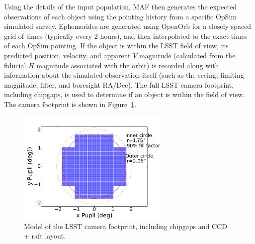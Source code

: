 Using the details of the input population, MAF then generates the expected observations of each object using the pointing history from a specific OpSim simulated survey. Ephemerides are generated using OpenOrb \citep{OpenOrb2009} for a closely spaced grid of times (typically every 2 hours), and then interpolated to the exact times of each OpSim pointing. If the object is within the LSST field of view, its predicted position, velocity, and apparent $V$ magnitude (calculated from the fiducial $H$ magnitude associated with the orbit) is recorded along with information about the simulated observation itself (such as the seeing, limiting magnitude, filter, and boresight RA/Dec). The full LSST camera footprint, including chipgaps, is used to determine if an object is within the field of view. The camera footprint is shown in Figure~\ref{fig:camera_footprint}.

\begin{figure}
\centering
\includegraphics[width=0.65\textwidth]{figures/focalplane} 
\caption{Model of the LSST camera footprint, including chipgaps and CCD + raft layout. \label{fig:camera_footprint}}
\end{figure}

